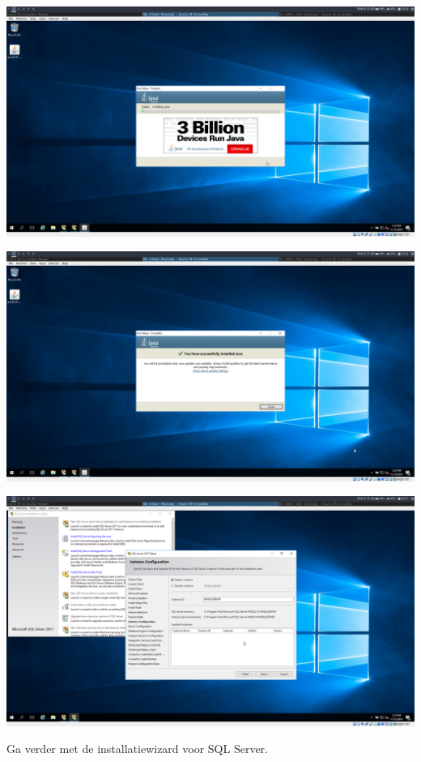 \documentclass[a4paper]{article}
\begin{document}
\begin{center}
	\includegraphics[width=15cm]{Pictures/SQL/1542316953.png}
\end{center}
\begin{center}
	\includegraphics[width=15cm]{Pictures/SQL/1542316980.png}
\end{center}
\begin{center}
	\includegraphics[width=15cm]{Pictures/SQL/1542317256.png}
	
	Ga verder met de installatiewizard voor SQL Server.
\end{center}
\end{document}
